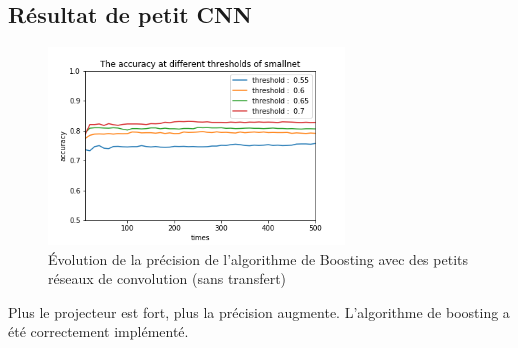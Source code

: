 \documentclass{beamer}
\begin{document}
    \subsection{Résultat de petit CNN }
    	\begin{frame}
        
    		\begin{figure}[H]
            \begin{center}
            \centerline{\includegraphics[width=0.7\textwidth]{smallnet.png}}
            \caption{Évolution de la précision de l'algorithme de Boosting avec des petits réseaux de convolution (sans transfert) }
            \label{fig:smallNet}
            \end{center}
            \end{figure}
        Plus le projecteur est fort, plus la précision augmente.  \newline
        L'algorithme de boosting a été correctement implémenté.  
        
    	\end{frame}
        
\end{document}

